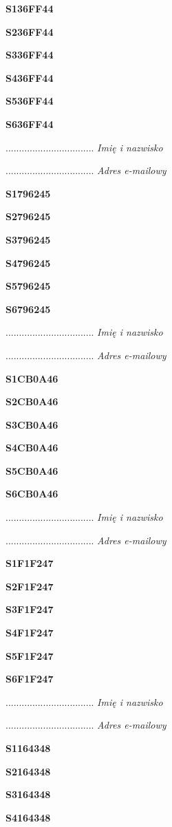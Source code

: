 \Large \textbf{S136FF44}

\Large \textbf{S236FF44}

\Large \textbf{S336FF44}

\Large \textbf{S436FF44}

\Large \textbf{S536FF44}

\Large \textbf{S636FF44}

.................................
\textit{Imię i nazwisko}

.................................
\textit{Adres e-mailowy}

\Large \textbf{S1796245}

\Large \textbf{S2796245}

\Large \textbf{S3796245}

\Large \textbf{S4796245}

\Large \textbf{S5796245}

\Large \textbf{S6796245}

.................................
\textit{Imię i nazwisko}

.................................
\textit{Adres e-mailowy}

\Large \textbf{S1CB0A46}

\Large \textbf{S2CB0A46}

\Large \textbf{S3CB0A46}

\Large \textbf{S4CB0A46}

\Large \textbf{S5CB0A46}

\Large \textbf{S6CB0A46}

.................................
\textit{Imię i nazwisko}

.................................
\textit{Adres e-mailowy}

\Large \textbf{S1F1F247}

\Large \textbf{S2F1F247}

\Large \textbf{S3F1F247}

\Large \textbf{S4F1F247}

\Large \textbf{S5F1F247}

\Large \textbf{S6F1F247}

.................................
\textit{Imię i nazwisko}

.................................
\textit{Adres e-mailowy}

\Large \textbf{S1164348}

\Large \textbf{S2164348}

\Large \textbf{S3164348}

\Large \textbf{S4164348}

